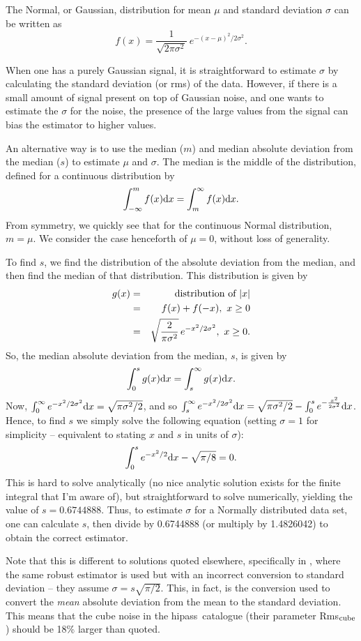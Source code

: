 \documentclass[12pt,a4paper]{article}
\newcommand{\hipass}{{\sc hipass}}
\newcommand{\diff}{{\rm d}}
\begin{document}
The Normal, or Gaussian, distribution for mean $\mu$ and standard
deviation $\sigma$ can be written as 
\[ 
f(x) = \frac{1}{\sqrt{2\pi\sigma^2}}\ e^{-(x-\mu)^2/2\sigma^2}.
 \]

When one has a purely Gaussian signal, it is straightforward to
estimate $\sigma$ by calculating the standard deviation (or rms) of
the data. However, if there is a small amount of signal present on top
of Gaussian noise, and one wants to estimate the $\sigma$ for the
noise, the presence of the large values from the signal can bias the
estimator to higher values.

An alternative way is to use the median ($m$) and median absolute deviation
from the median ($s$) to estimate $\mu$ and $\sigma$. The median is the
middle of the distribution, defined for a continuous distribution by
\[
\int_{-\infty}^{m} f(x) \diff x = \int_{m}^{\infty} f(x) \diff x.
\]
From symmetry, we quickly see that for the continuous Normal
distribution, $m=\mu$. We consider the case henceforth of $\mu=0$,
without loss of generality.

To find $s$, we find the distribution of the absolute deviation from
the median, and then find the median of that distribution. This
distribution is given by
\begin{eqnarray*}
g(x) &= &{\mbox{\rm distribution of }} |x|\\
     &= &f(x) + f(-x),\ x\ge0\\
     &= &\sqrt{\frac{2}{\pi\sigma^2}}\, e^{-x^2/2\sigma^2},\ x\ge0.
\end{eqnarray*}
So, the median absolute deviation from the median, $s$, is given by
\[
\int_{0}^{s} g(x) \diff x = \int_{s}^{\infty} g(x) \diff x.
\]
Now, $\int_{0}^{\infty}e^{-x^2/2\sigma^2} \diff x = \sqrt{\pi\sigma^2/2}$, and
so $\int_{s}^{\infty} e^{-x^2/2\sigma^2} \diff x =
\sqrt{\pi\sigma^2/2} - \int_{0}^{s} e^{-\frac{x^2}{2\sigma^2}} \diff x
$. Hence, to find $s$ we simply solve the following equation (setting $\sigma=1$ for
simplicity -- equivalent to stating $x$ and $s$ in units of $\sigma$):
\[
\int_{0}^{s}e^{-x^2/2} \diff x - \sqrt{\pi/8} = 0.
\]
This is hard to solve analytically (no nice analytic solution exists
for the finite integral that I'm aware of), but straightforward to
solve numerically, yielding the value of $s=0.6744888$. Thus, to
estimate $\sigma$ for a Normally distributed data set, one can calculate
$s$, then divide by 0.6744888 (or multiply by 1.4826042) to obtain the
correct estimator.

Note that this is different to solutions quoted elsewhere,
specifically in \citet{meyer04:trunc}, where the same robust estimator
is used but with an incorrect conversion to standard deviation -- they
assume $\sigma = s\sqrt{\pi/2}$. This, in fact, is the conversion used
to convert the \emph{mean} absolute deviation from the mean to the
standard deviation. This means that the cube noise in the \hipass\
catalogue (their parameter Rms$_{\rm cube}$) should be 18\% larger
than quoted.
\end{document}
